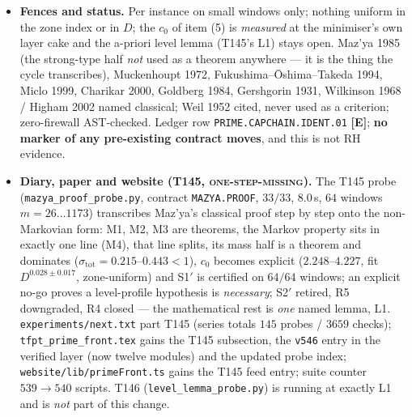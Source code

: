 \documentclass[11pt]{article}
\providecommand{\mE}{\textbf{[E]}}\providecommand{\mC}{\textbf{[C]}}
\begin{document}
\begin{itemize}[leftmargin=1.5em]
exhaustive enumeration of all $4095$ subsets of a small block (control: $c_0\times10^{-3}$ breaks
the certificate on every window).
\item \textbf{Fences and status.} Per instance on small windows only; nothing uniform in the zone
index or in $D$; the $c_0$ of item (5) is \emph{measured} at the minimiser's own layer cake and the
a-priori level lemma (T145's L1) stays open. Maz'ya 1985 (the strong-type half \emph{not} used as a
theorem anywhere --- it is the thing the cycle transcribes), Muckenhoupt 1972,
Fukushima--\=Oshima--Takeda 1994, Miclo 1999, Charikar 2000, Goldberg 1984, Gershgorin 1931,
Wilkinson 1968 / Higham 2002 named classical; Weil 1952 cited, never used as a criterion;
zero-firewall AST-checked. Ledger row \texttt{PRIME.CAPCHAIN.IDENT.01} \mE; \textbf{no marker of any
pre-existing contract moves}, and this is not RH evidence.
\item \textbf{Diary, paper and website (T145, \textsc{one-step-missing}).} The T145 probe
(\texttt{mazya\_proof\_probe.py}, contract \texttt{MAZYA.PROOF}, $33/33$, $8.0$\,s, $64$ windows
$m=26\ldots1173$) transcribes Maz'ya's classical proof step by step onto the non-Markovian form: M1,
M2, M3 are theorems, the Markov property sits in exactly one line (M4), that line splits, its mass
half is a theorem and dominates ($\sigma_{\mathrm{tot}}=0.215$--$0.443<1$), $c_0$ becomes explicit
($2.248$--$4.227$, fit $D^{0.028\pm0.017}$, zone-uniform) and S1$'$ is certified on $64/64$
windows; an explicit no-go proves a level-profile hypothesis is \emph{necessary}; S2$'$ retired, R5
downgraded, R4 closed --- the mathematical rest is \emph{one} named lemma, L1.
\texttt{experiments/next.txt} part T145 (series totals $145$ probes / $3659$ checks);
\texttt{tfpt\_prime\_front.tex} gains the T145 subsection, the \texttt{v546} entry in the verified
layer (now twelve modules) and the updated probe index; \texttt{website/lib/primeFront.ts} gains the
T145 feed entry; suite counter $539\to540$ scripts. T146 (\texttt{level\_lemma\_probe.py}) is
running at exactly L1 and is \emph{not} part of this change.
\end{itemize}
\end{document}
